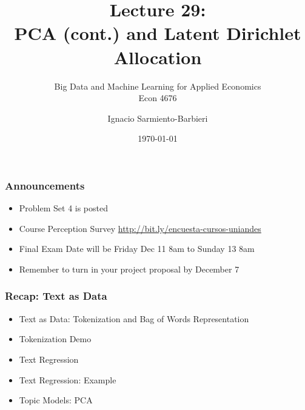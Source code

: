 \documentclass[
  shownotes,
  xcolor={svgnames},
  hyperref={colorlinks,citecolor=DarkBlue,linkcolor=DarkRed,urlcolor=DarkBlue}
  , aspectratio=169]{beamer}
\begin{document}
\title[Lecture 29]{Lecture 29: \\ PCA (cont.) and Latent Dirichlet Allocation}
\subtitle{Big Data and Machine Learning for Applied Economics \\ Econ 4676}
\date{\today}

\author[Sarmiento-Barbieri]{Ignacio Sarmiento-Barbieri}


\begin{frame}[noframenumbering]
\maketitle
\end{frame}





\begin{frame}
\frametitle{Announcements }


\begin{itemize} 
    \item  Problem Set 4 is posted
    \bigskip
    \item Course Perception Survey \url{http://bit.ly/encuesta-cursos-uniandes}
    \bigskip
    \item  Final Exam Date will be Friday Dec 11 8am to Sunday 13 8am
    \bigskip
    \item  Remember to turn in your project proposal by December 7
    
\end{itemize}
\end{frame}

\begin{frame}
\frametitle{Recap: Text as Data}

  
\begin{itemize} 
  
\item Text as Data: Tokenization and Bag of Words Representation
\medskip
\item Tokenization Demo
\medskip
\item Text Regression
\medskip
\item Text Regression: Example
\medskip
\item Topic Models: PCA

\end{itemize}
\end{frame}
\end{document}
